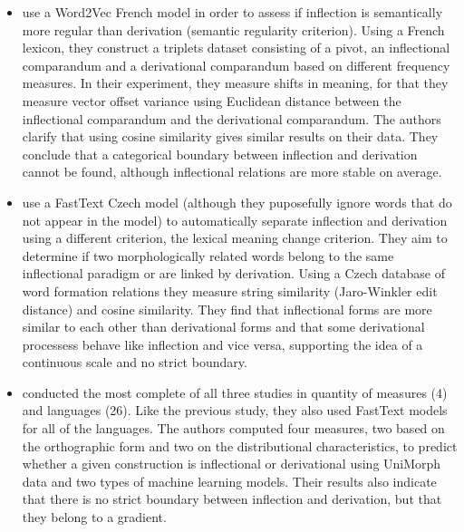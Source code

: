 \documentclass[12pt]{article}
\begin{document}
\begin{itemize}
    \item \textcite{bonami2018InflectionVsDerivation} use a Word2Vec French model in order to assess if inflection is semantically more regular than derivation (semantic regularity criterion). Using a French lexicon, they construct a triplets dataset consisting of a pivot, an inflectional comparandum and a derivational comparandum based on different frequency measures. In their experiment, they measure shifts in meaning, for that they measure vector offset variance using Euclidean distance between the inflectional comparandum and the derivational comparandum. The authors clarify that using cosine similarity gives similar results on their data. They conclude that a categorical boundary between inflection and derivation cannot be found, although inflectional relations are more stable on average.
    \item \textcite{rosa2019AttemptingSeparateInflection} use a FastText Czech model (although they puposefully ignore words that do not appear in the model) to automatically separate inflection and derivation using a different criterion, the lexical meaning change criterion. They aim to determine if two morphologically related words belong to the same inflectional paradigm or are linked by derivation. Using a Czech database of word formation relations they measure string similarity (Jaro-Winkler edit distance) and cosine similarity. They find that inflectional forms are more similar to each other than derivational forms and that some derivational processess behave like inflection and vice versa, supporting the idea of a continuous scale and no strict boundary.
    \item \textcite{haley2024CorpusbasedMeasuresDiscriminate} conducted the most complete of all three studies in quantity of measures (4) and languages (26). Like the previous study, they also used FastText models for all of the languages. The authors computed four measures, two based on the orthographic form and two on the distributional characteristics, to predict whether a given construction is inflectional or derivational using UniMorph data and two types of machine learning models. Their results also indicate that there is no strict boundary between inflection and derivation, but that they belong to a gradient.
\end{itemize}

\end{document}
